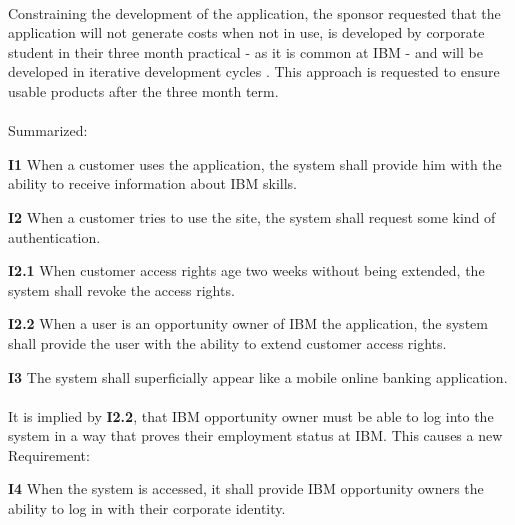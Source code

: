 \paragraph{} Constraining the development of the application, the sponsor requested that the application will not generate costs when not in use, is developed by corporate student in their three month practical - as it is common at IBM - and will be developed in iterative development cycles \parencite[cf.][]{Sachs.2017}. This approach is requested to ensure usable products after the three month term.

\paragraph{} Summarized:

\begin{closeItem}
    \item [\textbf{I1}] When a customer uses the application, the system shall provide him with the ability to receive information about IBM skills.
    \item [\textbf{I2}] When a customer tries to use the site, the system shall request some kind of authentication.
    \item [\textbf{I2.1}] When customer access rights age two weeks without being extended, the system shall revoke the access rights.
    \item [\textbf{I2.2}\label{R2.2}] When a user is an opportunity owner of IBM the application, the system shall provide the user with the ability to extend customer access rights.
    \item [\textbf{I3}] The system shall superficially appear like a mobile online banking application.
\end{closeItem}

\paragraph{} It is implied by \textbf{I2.2}, that IBM opportunity owner must be able to log into the system in a way that proves their employment status at IBM. This causes a new Requirement:

\begin{closeItem}
    \item [\textbf{I4}] When the system is accessed, it shall provide IBM opportunity owners the ability to log in with their corporate identity.
\end{closeItem}

